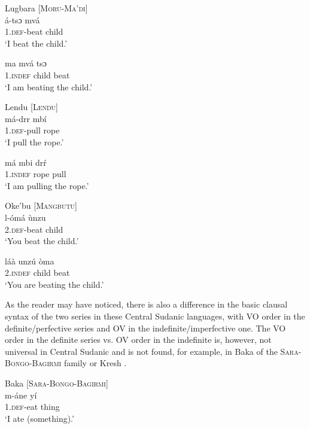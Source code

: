 \documentclass[output=paper]{langsci/langscibook}
\begin{document}
\ea\label{ex:anderson:52}
Lugbara \citep[47]{TuckerBryan1966}         \textsc{[Moru-Ma'di]} \\
\ea\label{ex:anderson:52a}
\gll á-tsɔ    mvá\\
  1.\textsc{def}-beat  child\\
  \glt `I beat the child.'
  
  \ex \label{ex:anderson:52b}
\gll ma    mvá  tsɔ\\
  1.\textsc{indef}  child  beat\\
\glt `I am beating the child.'
\z
\z

\ea\label{ex:anderson:53}
Lendu  \citep[46]{TuckerBryan1966}         [\textsc{Lendu}]\\
\ea\label{ex:anderson:53a}
\gll má-drr    mbí\\
  1.\textsc{def}-pull  rope\\
  \glt `I pull the rope.' 

\ex\label{ex:anderson:53b}
\gll má    mbi  dr\'{r}\\
  \textsc{1.indef}  rope  pull\\
\glt `I am pulling the rope.'
\z
\z

\ea\label{ex:anderson:54}
Oke'bu \citep[48]{TuckerBryan1966}        \textsc{[Mangbutu]}\\
\ea\label{ex:anderson:54a}
\gll l-ómá     ùnzu\\
  \textsc{2.def}-beat  child\\
\glt `You beat the child.'


\ex \label{ex:anderson:54b}
\gll láà    unzú  òma\\
  \textsc{2.indef}  child  beat\\
\glt `You are beating the child.'
\z
\z

As the reader may have noticed, there is also a difference in the basic clausal syntax of the two series in these Central Sudanic languages, with VO order in the definite/perfective series and OV in the indefinite/imperfective one. The VO order in the definite series vs. OV order in the indefinite is, however, not universal in Central Sudanic and is not found, for example, in Baka  of the \textsc{Sara-Bongo-Bagirmi} family or Kresh .

\ea\label{ex:anderson:55}
Baka \citep[75]{TuckerBryan1966}        [\textsc{Sara-Bongo-Bagirmi}]\\
\ea\label{ex:anderson:55a}
\gll m-áne    yí\\
  \textsc{1.def}-eat  thing\\
\glt `I ate (something).'
\end{document}
